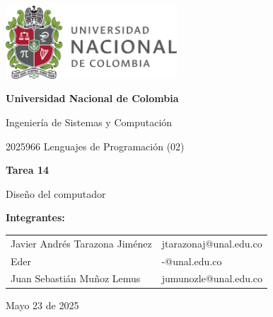 \documentclass{article}
\begin{document}
\begin{titlepage}
    \centering
    \includegraphics[width=0.48\textwidth]{logo_universidad.png}
    \par\vspace{2cm}

    {\Large \textbf{Universidad Nacional de Colombia} \par}
    \vspace{0.5cm}
    {\large Ingeniería de Sistemas y Computación \par}
    {\large 2025966 Lenguajes de Programación (02)\par}
    \vspace{3cm}

    {\large \textbf{Tarea 14} \par}
    {\large Diseño del computador\par}
    \vspace{3cm}

    {\large \textbf{Integrantes:} \par}
    \vspace{0.5cm}
    \begin{tabular}{ll}
    Javier Andrés Tarazona Jiménez & jtarazonaj@unal.edu.co \\
    Eder & -@unal.edu.co \\
    Juan Sebastián Muñoz Lemus & jumunozle@unal.edu.co \\
    \end{tabular}
    \par\vspace{3cm}

    {\large Mayo 23 de 2025 \par}
\end{titlepage}

\tableofcontents %

\newpage %

\end{document}
